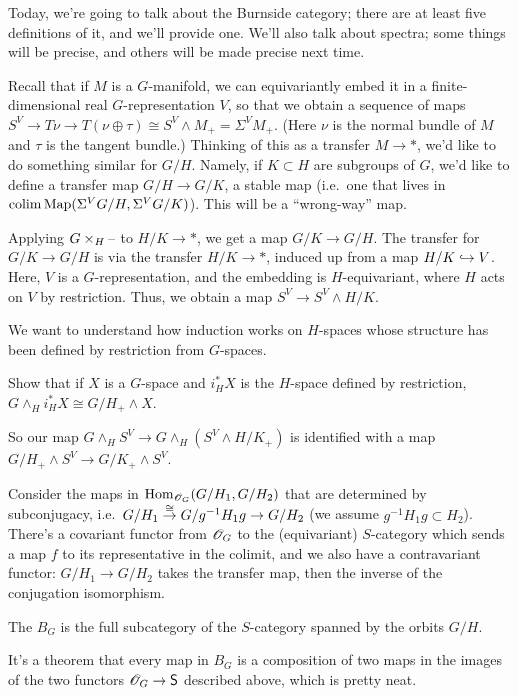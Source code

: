 Today, we're going to talk about the Burnside category; there are at least five definitions of it, and we'll
provide one. We'll also talk about spectra; some things will be precise, and others will be made precise next time.

Recall that if $M$ is a $G$-manifold, we can equivariantly embed it in a finite-dimensional real $G$-representation
$V$, so that we obtain a sequence of maps $S^V\to T\!\nu\to T(\nu\oplus\tau)\cong S^V\wedge M_+ = \Sigma^V M_+$.
(Here $\nu$ is the normal bundle of $M$ and $\tau$ is the tangent bundle.) Thinking of this as a transfer $M\to *$,
we'd like to do something similar for $G/H$. Namely, if $K\subset H$ are subgroups of $G$, we'd like to define a
transfer map $G/H\to G/K$, a stable map (i.e.\ one that lives in $\operatorname*{colim}\operatorname{Map}(\Sigma^V G/H, \Sigma^V G/K)$). This
will be a ``wrong-way'' map.

Applying $G\times_H\text{--}$ to $H/K\to *$, we get a map $G/K\to G/H$. The transfer for $G/K\to G/H$ is via the transfer
$H/K\to *$, induced up from a map $H/K\hookrightarrow V$. Here, $V$ is a $G$-representation, and the embedding is
$H$-equivariant, where $H$ acts on $V$ by restriction. Thus, we obtain a map $S^V\to S^V\wedge H/K$.

We want to understand how induction works on $H$-spaces whose structure has been defined by restriction from
$G$-spaces.
\begin{ex}
Show that if $X$ is a $G$-space and $i_H^*X$ is the $H$-space defined by restriction, $G\wedge_H i_H^*X\cong
G/H_+\wedge X$.
\end{ex}
So our map $G\wedge_H S^V\to G\wedge_H(S^V\wedge H/K_+)$ is identified with a map $G/H_+\wedge S^V\to G/K_+\wedge
S^V$.

Consider the maps in $\operatorname{Hom}_{\mathscr O_G}(G/H_1, G/H_2)$ that are determined by subconjugacy, i.e.\ $G/H_1\stackrel\cong\to
G/g^{-1}H_1g\to G/H_2$ (we assume $g^{-1}H_1g\subset H_2$). There's a covariant functor from $\mathscr O_G$ to the
(equivariant) $S$-category which sends a map $f$ to its representative in the colimit, and we also have a
contravariant functor: $G/H_1\to G/H_2$ takes the transfer map, then the inverse of the conjugation isomorphism.
\begin{defn}
The  $B_G$ is the full subcategory of the $S$-category spanned by the orbits $G/H$.
\end{defn}
It's a theorem that every map in $B_G$ is a composition of two maps in the images of the two functors $\mathscr O_G\to\mathsf
S$ described above, which is pretty neat.

